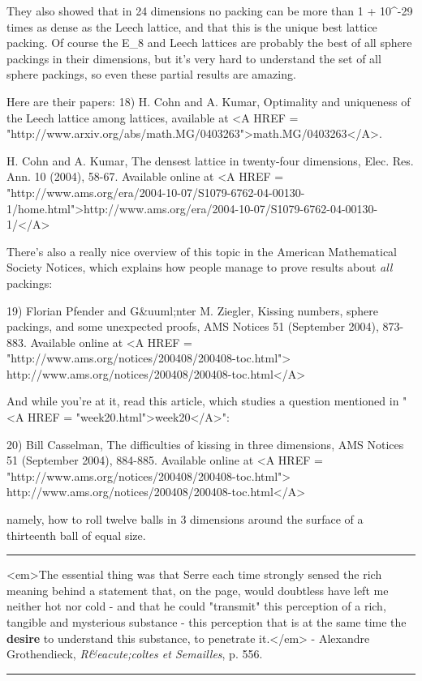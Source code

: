 They also showed that in 24 dimensions no packing can be more than
1 + 10^{-29} times as dense as the Leech lattice, and that
this is the unique best lattice packing.  Of course the 
E_{8} and Leech lattices are probably the best of all sphere packings 
in their dimensions, but it's very hard to understand the set of 
all sphere packings, so even these partial results are amazing.

Here are their papers:
18) H. Cohn and A. Kumar, Optimality and uniqueness of the 
Leech lattice among lattices, available at <A HREF = 
"http://www.arxiv.org/abs/math.MG/0403263">math.MG/0403263</A>.

H. Cohn and A. Kumar, The densest lattice in twenty-four
dimensions, Elec. Res. Ann. 10 (2004), 58-67.   Available online
at <A HREF = "http://www.ams.org/era/2004-10-07/S1079-6762-04-00130-1/home.html">http://www.ams.org/era/2004-10-07/S1079-6762-04-00130-1/</A>

There's also a really nice overview of this topic in the 
American Mathematical Society Notices, which explains how
people manage to prove results about \emph{all} packings:

19) Florian Pfender and G&uuml;nter M. Ziegler, 
Kissing numbers, sphere packings, and some unexpected
proofs, AMS Notices 51 (September 2004), 873-883.
Available online at 
<A HREF = "http://www.ams.org/notices/200408/200408-toc.html">
http://www.ams.org/notices/200408/200408-toc.html</A>

And while you're at it, read this article, which
studies a question mentioned
in "<A HREF = "week20.html">week20</A>":

20) Bill Casselman, The difficulties of kissing in three 
dimensions, AMS Notices 51 (September 2004), 884-885.
Available online at <A HREF = "http://www.ams.org/notices/200408/200408-toc.html">
http://www.ams.org/notices/200408/200408-toc.html</A>

namely, how to roll twelve balls in 3 dimensions around the surface 
of a thirteenth ball of equal size. 


\par\noindent\rule{\textwidth}{0.4pt}
<em>The essential thing was that Serre each time strongly sensed
the rich meaning behind a statement that, on the page, would doubtless
have left me neither hot nor cold - and that he could "transmit"
this perception of a rich, tangible and mysterious substance - this
perception that is at the same time the \textbf{desire} to understand
this substance, to penetrate it.</em> - Alexandre Grothendieck, 
\emph{R&eacute;coltes et Semailles}, p. 556.
 
\par\noindent\rule{\textwidth}{0.4pt}

